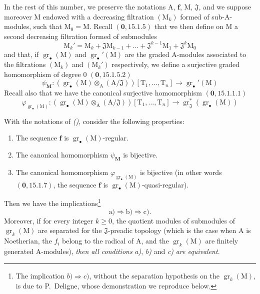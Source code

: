 \begin{env}[19.5.4]
\label{IV.19.5.4}
In the rest of this number, we preserve the notations $\mathrm{A}$, $\mathbf{f}$, $\mathrm{M}$, $\mathfrak{J}$, and we suppose moreover $\mathrm{M}$ endowed with a decreasing filtration $(\mathrm{M}_k)$ formed of sub-$\mathrm{A}$-modules, such that $\mathrm{M}_0=\mathrm{M}$. Recall $(\mathbf{0},15.1.5)$ that we then define on $\mathrm{M}$ a second decreasing filtration formed of submodules
\[
  \mathrm{M}_k'=\mathrm{M}_k+\mathfrak{J}\mathrm{M}_{k-1}+\ldots+\mathfrak{J}^{k-1}\mathrm{M}_1+\mathfrak{J}^k\mathrm{M}_0
\]
and that, if $\operatorname{gr}_\bullet(\mathrm{M})$ and $\operatorname{gr}_\bullet'(\mathrm{M})$ are the graded $\mathrm{A}$-modules associated to the filtrations $(\mathrm{M}_k)$ and $(\mathrm{M}_k')$ respectively, we define a surjective graded homomorphism of degree $0$ $(\mathbf{0},15.1.5.2)$
\[
  \psi_\mathbf{M}:(\operatorname{gr}_\bullet(\mathrm{M})\otimes_\mathrm{A}(\mathrm{A}/\mathfrak{J}))[\mathrm{T}_1,\ldots,\mathrm{T}_n]\to\operatorname{gr}_\bullet'(\mathrm{M})
\]
Recall also that we have the canonical surjective homomorphism $(\mathbf{0},15.1.1.1)$
\[
  \varphi_{\operatorname{gr}_\bullet(\mathrm{M})}:(\operatorname{gr}_\bullet(\mathrm{M})\otimes_\mathrm{A}(\mathrm{A}/\mathfrak{J}))[\mathrm{T}_1,\ldots,\mathrm{T}_n]\to\operatorname{gr}_\mathfrak{J}^*(\operatorname{gr}_\bullet(\mathrm{M}))
\]
\end{env}

\begin{theorem}[19.5.5]
\label{IV.19.5.5}
With the notations of \emph{()}, consider the following properties:
\begin{enumerate}
\item[\rm a)] The sequence $\mathbf{f}$ is $\operatorname{gr}_\bullet(\mathrm{M})$-regular.
\item[\rm b)] The canonical homomorphism $\psi_\mathbf{M}$ is bijective.
\item[\rm c)] The canonical homomorphism $\varphi_{\operatorname{gr}_\bullet(\mathrm{M})}$ is bijective (in other words $(\mathbf{0},15.1.7)$, the sequence $\mathbf{f}$ is $\operatorname{gr}_\bullet(\mathrm{M})$-quasi-regular).
\end{enumerate}
Then we have the implications\footnote{The implication $b)\Rightarrow c)$, without the separation hypothesis on the $\operatorname{gr}_k(\mathrm{M})$, is due to P.~Deligne, whose demonstration we reproduce below.}
\[
  \text{a)}\Rightarrow\text{b)}\Rightarrow\text{c)}.
\]
Moreover, if for every integer $k\geqslant 0$, the quotient modules of submodules of $\operatorname{gr}_k(\mathrm{M})$ are separated for the $\mathfrak{J}$-preadic topology (which is the case when $\mathrm{A}$ is Noetherian, the $f_i$ belong to the radical of $\mathrm{A}$, and the $\operatorname{gr}_k(\mathrm{M})$ are finitely generated $\mathrm{A}$-modules), \emph{then all conditions} \emph{a)}, \emph{b)} and \emph{c)} \emph{are equivalent}.
\end{theorem}


